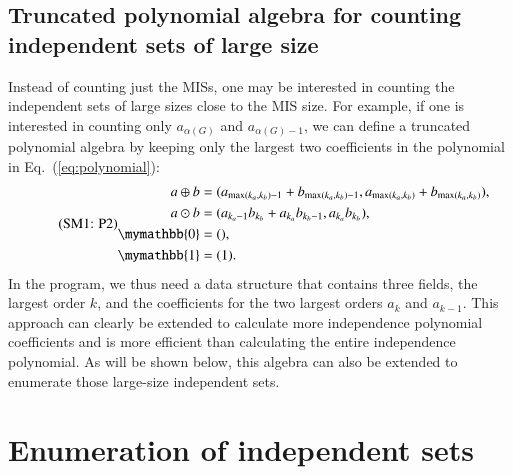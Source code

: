 \documentclass[onefignum, onetabnum]{siamart190516}
\newcommand{\eqname}[1]{\stepcounter{equation}\tag{\theequation : #1}}
\newcommand{\<}{\langle}
\renewcommand{\>}{\rangle}
\newcommand{\Eq}[1]{Eq.~(\ref{#1})}
\newcounter{example}
\begin{document}
\subsection{Truncated polynomial algebra for counting independent sets of large size}
Instead of counting just the MISs, one may be interested in counting the independent sets of large sizes close to the MIS size.
For example, if one is interested in counting only $a_{\alpha(G)}$ and $a_{\alpha(G)-1}$, we can define a truncated polynomial algebra by keeping only the largest two coefficients in the polynomial in \Eq{eq:polynomial}:
\begin{equation}
    \eqname{P2}
    \begin{split}
    a \oplus b &= (a_{\max(k_a, k_b)-1} + b_{\max(k_a, k_b)-1}, a_{\max(k_a, k_b)} + b_{\max(k_a, k_b)}),\\
    a \odot b &= (a_{k_a-1} b_{k_b}+a_{k_a} b_{k_b-1}, a_{k_a} b_{k_b}),\\
    \mymathbb{0} &= (), \\
    \mymathbb{1} &= (1).\label{eq:max2poly}
    \end{split}
\end{equation}
In the program, we thus need a data structure that contains three fields, the largest order $k$, and the coefficients for the two largest orders $a_k$ and $a_{k-1}$.
This approach can clearly be extended to calculate more independence polynomial coefficients and is more efficient than calculating the entire independence polynomial.
As will be shown below, this algebra can also be extended to enumerate those large-size independent sets.

\section{Enumeration of independent sets}
\end{document}

